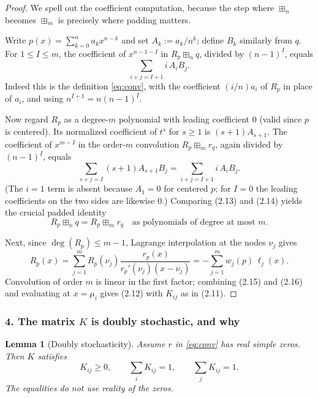 \documentclass{article}
\newtheorem{lemma}{Lemma}[section]
\begin{document}
\begin{proof}
We spell out the coefficient computation, because the step where $\boxplus_n$ becomes $\boxplus_m$ is precisely where padding matters.

Write $p(x) = \sum_{k=0}^n a_k x^{n-k}$ and set $A_k := a_k / n^{\underline{k}}$; define $B_k$ similarly from $q$. For $1 \le I \le m$, the coefficient of $x^{n-1-I}$ in $R_p \boxplus_n q$, divided by $(n-1)^{\underline{I}}$, equals
\begin{equation}
  \sum_{i+j=I+1} i\,A_i B_j. \tag{2.13}
\end{equation}
Indeed this is the definition \eqref{eq:conv}, with the coefficient $(i/n)a_i$ of $R_p$ in place of $a_i$, and using $n^{\underline{I+1}} = n(n-1)^{\underline{I}}$.

Now regard $R_p$ as a degree-$m$ polynomial with leading coefficient $0$ (valid since $p$ is centered). Its normalized coefficient of $t^s$ for $s \ge 1$ is $(s+1)A_{s+1}$. The coefficient of $x^{m-I}$ in the order-$m$ convolution $R_p \boxplus_m r_q$, again divided by $(n-1)^{\underline{I}}$, equals
\begin{equation}
  \sum_{s+j=I}(s+1)A_{s+1}B_j = \sum_{i+j=I+1} i\,A_i B_j. \tag{2.14}
\end{equation}
(The $i=1$ term is absent because $A_1 = 0$ for centered $p$; for $I=0$ the leading coefficients on the two sides are likewise $0$.) Comparing (2.13) and (2.14) yields the crucial padded identity
\begin{equation}
  R_p \boxplus_n q = R_p \boxplus_m r_q \quad \text{as polynomials of degree at most } m. \tag{2.15}
\end{equation}

Next, since $\deg(R_p) \le m-1$, Lagrange interpolation at the nodes $\nu_j$ gives
\begin{equation}
  R_p(x) = \sum_{j=1}^{m} R_p(\nu_j) \frac{\,r_p(x)}{r_p'(\nu_j)(x-\nu_j)} = -\sum_{j=1}^{m} w_j(p)\,\ell_j(x). \tag{2.16}
\end{equation}
Convolution of order $m$ is linear in the first factor; combining (2.15) and (2.16) and evaluating at $x = \mu_i$ gives (2.12) with $K_{ij}$ as in (2.11).
\end{proof}

\subsubsection*{4. The matrix $K$ is doubly stochastic, and why}

\begin{lemma}[Doubly stochasticity]\label{lem:ds}
Assume $r$ in \eqref{eq:conv} has real simple zeros. Then $K$ satisfies
\begin{equation}
  K_{ij} \ge 0, \qquad \sum_i K_{ij} = 1, \qquad \sum_j K_{ij} = 1. \tag{2.17}
\end{equation}
The equalities do not use reality of the zeros.
\end{lemma}
\end{document}
